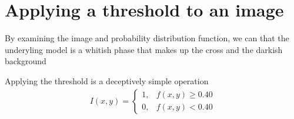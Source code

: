 \documentclass[letterpaper,10pt,english]{sphinxmanual}
\begin{document}
\begin{sphinxVerbatim}[commandchars=\\\{\}]
   
 
  
\end{sphinxVerbatim}

\noindent{}


\section{Applying a threshold to an image}
\label{\detokenize{04-BasicSegmentation:applying-a-threshold-to-an-image}}
\sphinxAtStartPar
By examining the image and probability distribution function, we can  that the underyling model is a whitish phase that makes up the cross and the darkish background

\sphinxAtStartPar
Applying the threshold is a deceptively simple operation
\begin{equation*}
\begin{split} I(x,y) = 
\begin{cases}
1, & f(x,y)\geq0.40 \\
0, & f(x,y)<0.40
\end{cases}\end{split}
\end{equation*}
\begin{sphinxVerbatim}[commandchars=\\\{\}]
  
    
\end{sphinxVerbatim}
\end{document}
